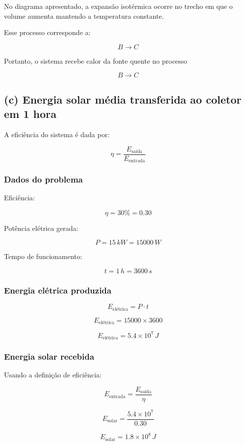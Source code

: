 \documentclass[a4paper,12pt]{article}
\begin{document}
No diagrama apresentado, a expansão isotérmica ocorre no trecho em que o volume aumenta mantendo a temperatura constante.

Esse processo corresponde a:

\[
B \rightarrow C
\]

Portanto, o sistema recebe calor da fonte quente no processo

\[
\boxed{B \rightarrow C}
\]

\subsection*{(c) Energia solar média transferida ao coletor em 1 hora}

A eficiência do sistema é dada por:

\[
\eta = \frac{E_{\text{saída}}}{E_{\text{entrada}}}
\]

\subsubsection*{Dados do problema}

Eficiência:

\[
\eta = 30\% = 0.30
\]

Potência elétrica gerada:

\[
P = 15\,kW = 15000\,W
\]

Tempo de funcionamento:

\[
t = 1\,h = 3600\,s
\]

\subsubsection*{Energia elétrica produzida}

\[
E_{\text{elétrica}} = P \cdot t
\]

\[
E_{\text{elétrica}} = 15000 \times 3600
\]

\[
E_{\text{elétrica}} = 5.4 \times 10^{7}\,J
\]

\subsubsection*{Energia solar recebida}

Usando a definição de eficiência:

\[
E_{\text{entrada}} = \frac{E_{\text{saída}}}{\eta}
\]

\[
E_{\text{solar}} =
\frac{5.4 \times 10^{7}}{0.30}
\]

\[
E_{\text{solar}} = 1.8 \times 10^{8}\,J
\]
\end{document}
